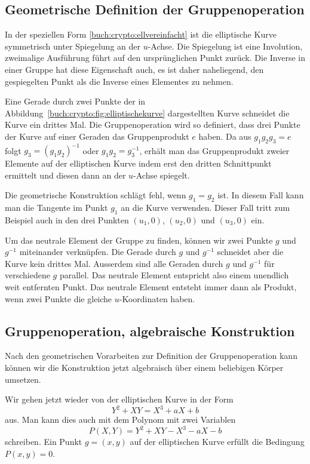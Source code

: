 \subsection{Geometrische Definition der Gruppenoperation}
In der speziellen Form \ref{buch:crypto:ellvereinfacht} ist die
elliptische Kurve symmetrisch unter Spiegelung an der $u$-Achse.
Die Spiegelung ist eine Involution, zweimalige Ausführung führt auf
den ursprünglichen Punkt zurück.
Die Inverse in einer Gruppe hat diese Eigenschaft auch, es ist
daher naheliegend, den gespiegelten Punkt als die Inverse eines
Elementes zu nehmen.

Eine Gerade durch zwei Punkte der
in Abbildung~\ref{buch:crypto:fig:elliptischekurve}
dargestellten Kurve schneidet die Kurve ein drittes Mal.
Die Gruppenoperation wird so definiert, dass drei Punkte der Kurve
auf einer Geraden das Gruppenprodukt $e$ haben.
Da aus $g_1g_2g_3=e$ folgt $g_3=(g_1g_2)^{-1}$ oder
$g_1g_2=g_3^{-1}$, erhält man das Gruppenprodukt zweier Elemente
auf der elliptischen Kurve indem erst den dritten Schnittpunkt
ermittelt und diesen dann an der $u$-Achse spiegelt.

Die geometrische Konstruktion schlägt fehl, wenn $g_1=g_2$ ist.
In diesem Fall kann man die Tangente im Punkt $g_1$ an die Kurve 
verwenden.
Dieser Fall tritt zum Beispiel auch in den drei Punkten 
$(u_1,0)$, $(u_2,0)$ und $(u_3,0)$ ein.

Um das neutrale Element der Gruppe zu finden, können wir 
zwei Punkte $g$ und $g^{-1}$ miteinander verknüpfen.
Die Gerade durch $g$ und $g^{-1}$ schneidet aber die Kurve
kein drittes Mal.
Ausserdem sind alle Geraden durch $g$ und $g^{-1}$ für verschiedene
$g$ parallel.
Das neutrale Element entspricht also einem unendlich weit entfernten Punkt.
Das neutrale Element entsteht immer dann als Produkt, wenn zwei
Punkte die gleiche $u$-Koordinaten haben.

\subsection{Gruppenoperation, algebraische Konstruktion}
Nach den geometrischen Vorarbeiten zur Definition der Gruppenoperation
kann können wir die Konstruktion jetzt algebraisch über einem 
beliebigen Körper umsetzen.

Wir gehen jetzt wieder von der elliptischen Kurve in der Form
\begin{equation}
Y^2+XY=X^3+aX+b
\label{buch:crypto:eqn:grupopgl}
\end{equation}
aus.
Man kann dies auch mit dem Polynom mit zwei Variablen
\[
P(X,Y) = Y^2+XY -X^3-aX-b
\]
schreiben.
Ein Punkt $g=(x,y)$ auf der elliptischen Kurve erfüllt die
Bedingung $P(x,y)=0$.

